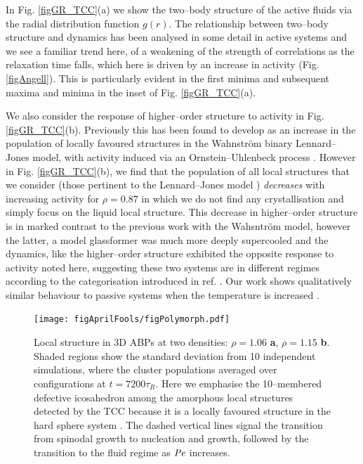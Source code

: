 In Fig. \ref{figGR_TCC}(a) we show the two--body structure of the active fluids via the radial distribution function $g(r)$. The relationship between two--body structure and dynamics has been analysed in some detail in active systems \cite{janssen2019,szamel2015,berthier2017,dougan2016} and we see a familiar trend here, of a weakening of the strength of correlations as the relaxation time falls, which here is driven by an increase in activity (Fig. \ref{figAngell}).
This is particularly evident in the first minima and subsequent maxima and minima in the inset of Fig. \ref{figGR_TCC}(a).



We also consider the response of higher--order structure to activity in Fig. \ref{figGR_TCC}(b). Previously this has been found to develop as an increase in the population of locally favoured structures 
in the Wahnstr\"{o}m binary Lennard--Jones model, with activity induced via an Ornstein--Uhlenbeck process \cite{dougan2016}. However in Fig. \ref{figGR_TCC}(b), we find that the population of all local structures that we consider (those pertinent to the Lennard--Jones model \cite{wales1997,taffs2010}) \emph{decreases} with increasing activity for $\rho=0.87$ in which we do not find any crystallisation and simply focus on the liquid local structure. This decrease in higher--order structure is in marked contrast to the previous work with the Wahsntr\"{o}m model, however the latter, a model glassformer was much more deeply supercooled and the dynamics, like the higher--order structure exhibited the opposite response to activity noted here, suggesting these two systems are in different regimes according to the categorisation introduced in ref. \cite{berthier2017}. Our work shows qualitatively similar behaviour to passive systems when the temperature is increased \cite{royall2015a,taffs2010,malins2013fara}.














\begin{figure}
\texttt{[image: figAprilFools/figPolymorph.pdf]}
\caption[Polymorph selection in active Brownian Particles]{Local structure in 3D ABPs at two densities: $\rho=1.06$ \textbf{a}, $\rho=1.15$ \textbf{b}. Shaded regions show the standard deviation from 10 independent simulations, where the cluster populations averaged over configurations at $t=7200\tau_R$. Here we emphasise the 10--membered defective icosahedron among the amorphous local structures detected by the TCC because it is a locally favoured structure in the hard sphere system \cite{royall2015,hallett2018}. The dashed vertical lines signal the transition from spinodal growth to nucleation and growth, followed by the transition to the fluid regime as $\operatorname{\mathit{P\kern-.08em e}}$ increases.}
\label{figPolymorph}
\end{figure}

